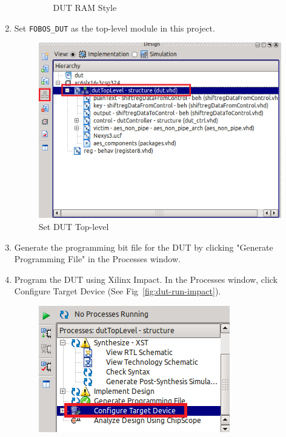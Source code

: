 \begin{enumerate}
\begin{enumerate}
\begin{figure}
\begin{center}
		\caption{\label{fig:dut-ram-style}DUT RAM Style}
		\end{center}
		\vspace{-3ex}
		\end{figure}
     \end{enumerate}
  \item Set \texttt{FOBOS\_DUT} as the top-level module in this project.
		\begin{figure} 
		\begin{center}
		\includegraphics[scale=0.6]{figures/dut-set-top-level}
		\caption{\label{fig:dut-set-top-level}Set DUT Top-level}
		\end{center}
		\vspace{-3ex}
		\end{figure}
  \item Generate the programming bit file for the DUT by clicking "Generate Programming File" in the Processes window.
  \item Program the DUT using Xilinx Impact. In the Processes window, click Configure Target Device (See Fig~\ref{fig:dut-run-impact}).
		\begin{figure} 
		\begin{center}
		\includegraphics[scale=0.6]{figures/dut-run-impact}

\end{center}
\end{figure}
\end{enumerate}
